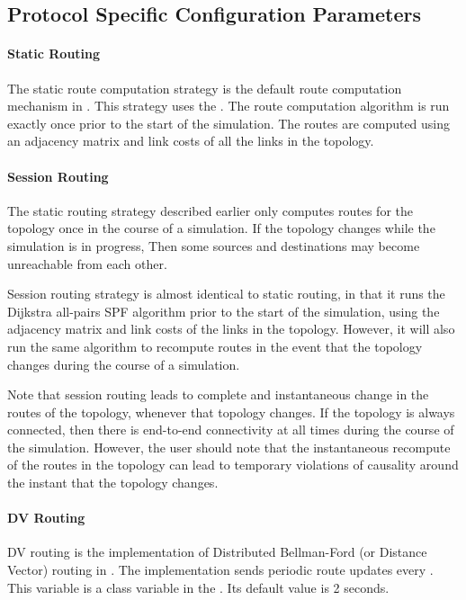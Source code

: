 \subsection{Protocol Specific Configuration Parameters}

\paragraph{Static Routing}
The static route computation strategy is
the default route computation mechanism  in \ns.
This strategy uses the
.
The route computation algorithm is run exactly once
prior to the start of the simulation.
The routes are computed
using an adjacency matrix and link costs of all the links in the topology.

\paragraph{Session Routing}
The static routing strategy described earlier
only computes routes for the topology once in the course of a simulation.
If the topology changes while the simulation is in progress,
Then some sources and destinations may become unreachable from each other.

Session routing strategy is almost identical to static routing,
in that it runs the Dijkstra all-pairs SPF algorithm
prior to the start of the simulation, using the
adjacency matrix and link costs of the links in the topology.
However, it will also run the same algorithm to recompute routes
in the event that the topology changes during the course of a simulation.

Note that session routing leads to complete and instantaneous change
in the routes of the topology, whenever that topology changes.
If the topology is always connected, then there is
end-to-end connectivity at all times during the course of the simulation.
However, the user should note that the instantaneous recompute of the
routes in the topology can lead to temporary violations of causality
around the instant that the topology changes.

\paragraph{DV Routing}
DV routing is the implementation of
Distributed Bellman-Ford (or Distance Vector) routing in \ns.
The implementation sends periodic route updates every .
This variable is a class variable in the .
Its default value is 2 seconds.

